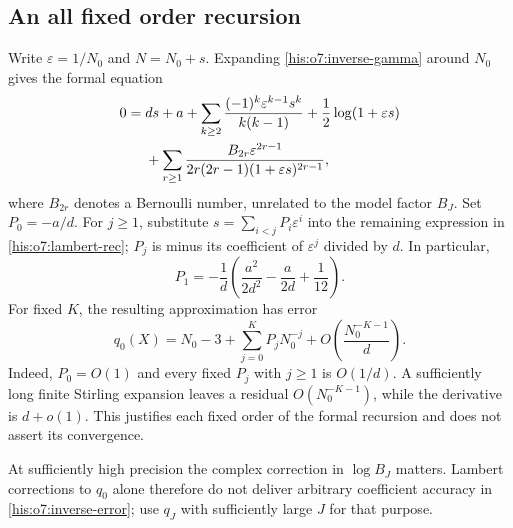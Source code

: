 \documentclass[11pt]{article}
\theoremstyle{remark}\newtheorem{remark}[theorem]{Remark}
\newcommand{\eps}{\varepsilon}
\numberwithin{equation}{section}
\begin{document}
\subsection{An all fixed order recursion}
Write $\eps=1/N_0$ and $N=N_0+s$. Expanding
\eqref{his:o7:inverse-gamma} around $N_0$ gives the formal equation
\begin{align}\label{his:o7:lambert-rec}
0={}&ds+a+
\sum_{k\ge2}\frac{(-1)^k\eps^{k-1}s^k}{k(k-1)}
+\frac12\log(1+\eps s)\notag\\
&+\sum_{r\ge1}
\frac{B_{2r}\eps^{2r-1}}
{2r(2r-1)(1+\eps s)^{2r-1}},
\end{align}
where $B_{2r}$ denotes a Bernoulli number, unrelated to the model
factor $B_J$. Set $P_0=-a/d$. For $j\ge1$, substitute
$s=\sum_{i<j}P_i\eps^i$ into the remaining expression in
\eqref{his:o7:lambert-rec}; $P_j$ is minus its coefficient of $\eps^j$
divided by $d$. In particular,
\[
P_1=-\frac1d\left(\frac{a^2}{2d^2}-\frac a{2d}+\frac1{12}\right).
\]
For fixed $K$, the resulting approximation has error
\begin{equation}\label{his:o7:lambert-error}
q_0(X)=N_0-3+\sum_{j=0}^KP_jN_0^{-j}
+O\!\left(\frac{N_0^{-K-1}}d\right).
\end{equation}
Indeed, $P_0=O(1)$ and every fixed $P_j$ with $j\ge1$ is
$O(1/d)$. A sufficiently long finite Stirling expansion leaves a
residual $O(N_0^{-K-1})$, while the derivative is $d+o(1)$.
This justifies each fixed order of the formal recursion and does
not assert its convergence.

At sufficiently high precision the complex correction in
$\log B_J$ matters. Lambert corrections to $q_0$ alone therefore
do not deliver arbitrary coefficient accuracy in \eqref{his:o7:inverse-error};
use $q_J$ with sufficiently large $J$ for that purpose.
\end{document}
